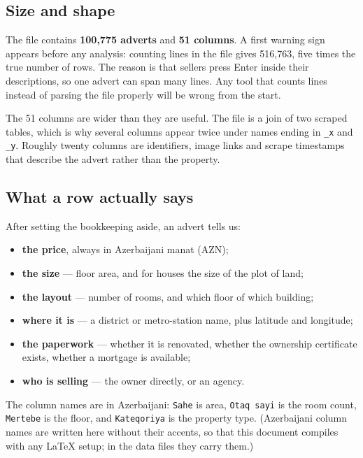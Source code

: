 \documentclass[10pt,twocolumn,a4paper]{article}
\begin{document}
\subsection{Size and shape}

The file contains \textbf{100{,}775 adverts} and \textbf{51 columns}.
A first warning sign appears before any analysis: counting lines in the
file gives 516{,}763, five times the true number of rows. The reason is
that sellers press Enter inside their descriptions, so one advert can
span many lines. Any tool that counts lines instead of parsing the file
properly will be wrong from the start.

The 51 columns are wider than they are useful. The file is a join of two
scraped tables, which is why several columns appear twice under names
ending in \texttt{\_x} and \texttt{\_y}. Roughly twenty columns are
identifiers, image links and scrape timestamps that describe the advert
rather than the property.

\subsection{What a row actually says}

After setting the bookkeeping aside, an advert tells us:

\begin{itemize}\itemsep2pt
  \item \textbf{the price}, always in Azerbaijani manat (AZN);
  \item \textbf{the size} --- floor area, and for houses the size of the
        plot of land;
  \item \textbf{the layout} --- number of rooms, and which floor of which
        building;
  \item \textbf{where it is} --- a district or metro-station name, plus
        latitude and longitude;
  \item \textbf{the paperwork} --- whether it is renovated, whether the
        ownership certificate exists, whether a mortgage is available;
  \item \textbf{who is selling} --- the owner directly, or an agency.
\end{itemize}

The column names are in Azerbaijani: \texttt{Sahe} is area,
\texttt{Otaq sayi} is the room count, \texttt{Mertebe} is the floor,
and \texttt{Kateqoriya} is the property type. (Azerbaijani column names
are written here without their accents, so that this document compiles
with any LaTeX setup; in the data files they carry them.)
\end{document}
